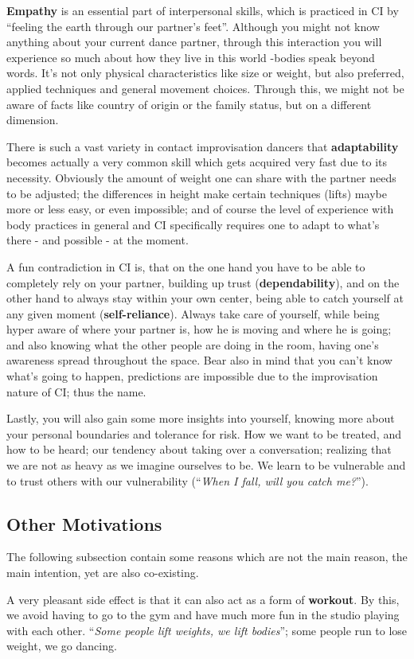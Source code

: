 \textbf{Empathy} is an essential part of interpersonal skills, which is practiced in CI by ``feeling the earth through our partner's feet''.
Although you might not know anything about your current dance partner, through this interaction you will experience so much about how they live in this world -bodies speak beyond words.
It's not only physical characteristics like size or weight, but also preferred, applied techniques and general movement choices.
Through this, we might not be aware of facts like country of origin or the family status, but on a different dimension.

There is such a vast variety in contact improvisation dancers that \textbf{adaptability} becomes actually a very common skill which gets acquired very fast due to its necessity.
Obviously the amount of weight one can share with the partner needs to be adjusted; the differences in height make certain techniques (lifts) maybe more or less easy, or even impossible; and of course the level of experience with body practices in general and CI specifically requires one to adapt to what's there - and possible - at the moment.

A fun contradiction in CI is, that on the one hand you have to be able to completely rely on your partner, building up trust (\textbf{dependability}), and on the other hand to always stay within your own center, being able to catch yourself at any given moment (\textbf{self-reliance}).
Always take care of yourself, while being hyper aware of where your partner is, how he is moving and where he is going; and also knowing what the other people are doing in the room, having one's awareness spread throughout the space.
Bear also in mind that you can't know what's going to happen, predictions are impossible due to the improvisation nature of CI; thus the name.

Lastly, you will also gain some more insights into yourself, knowing more about your personal boundaries and tolerance for risk.
How we want to be treated, and how to be heard; our tendency about taking over a conversation; realizing that we are not as heavy as we imagine ourselves to be.
We learn to be vulnerable and to trust others with our vulnerability (``\textit{When I fall, will you catch me?}'').

\subsection{Other Motivations}\label{subsec:other-motivations}

The following subsection contain some reasons which are not the main reason, the main intention, yet are also co-existing.

A very pleasant side effect is that it can also act as a form of \textbf{workout}.
By this, we avoid having to go to the gym and have much more fun in the studio playing with each other.
``\textit{Some people lift weights, we lift bodies}''; some people run to lose weight, we go dancing.